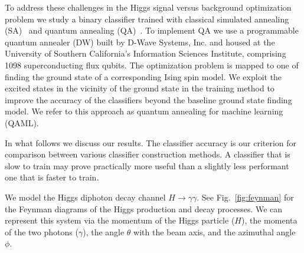 \documentclass[fleqn,10pt]{wlscirep}
\begin{document}
To address these challenges in the Higgs signal versus background optimization problem we study a binary classifier trained with classical simulated annealing (SA)~\cite{kirkpatrick_optimization_1983,katzgraber:06a} and quantum annealing (QA)~\cite{kadowaki_quantum_1998,RevModPhys.80.1061,Neven1,Pudenz:2013kx,q-sig2}. To implement QA we use a programmable quantum annealer (DW) built by D-Wave Systems, Inc. and housed at the University of Southern California's Information Sciences Institute, comprising 1098 superconducting flux qubits. The optimization problem is mapped to one of finding the ground state of a corresponding Ising spin model. We exploit the excited states in the vicinity of the ground state in the training method to improve the accuracy of the classifiers beyond the baseline ground state finding model. We refer to this  approach as quantum annealing for machine learning (QAML). 


In what follows we  discuss our results. 
The classifier accuracy is our criterion for comparison between various classifier construction methods.  A classifier that is slow to train may prove practically more useful than a slightly less performant one that is faster to train. 


We model the Higgs diphoton decay channel $H\rightarrow\gamma\gamma$. See Fig.~\ref{fig:feynman} for the Feynman diagrams of the Higgs production and decay processes. We can represent this system via the momentum of the Higgs particle ($H$), the momenta of the two photons ($\gamma$), the angle $\theta$ with the beam axis, and the azimuthal angle $\phi$.
 
\end{document}
